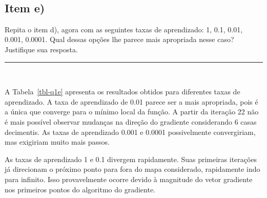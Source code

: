 \documentclass[
  a4paperpaper,
]{article}
\begin{document}
~

\subsection{Item e)}\label{item-e}

Repita o item d), agora com as seguintes taxas de aprendizado: 1, 0.1,
0.01, 0.001, 0.0001. Qual dessas opções lhe parece mais apropriada nesse
caso? Justifique sua resposta.

\begin{center}\rule{0.5\linewidth}{0.5pt}\end{center}

~

A Tabela~\ref{tbl-q1e} apresenta os resultados obtidos para diferentes
taxas de aprendizado. A taxa de aprendizado de 0.01 parece ser a mais
apropriada, pois é a única que converge para o mínimo local da função. A
partir da iteração 22 não é mais possível observar mudanças na direção
do gradiente considerando 6 casas decimentis. As taxas de aprendizado
0.001 e 0.0001 possivelmente convergiriam, mas exigiriam muito mais
passos.

As taxas de aprendizado 1 e 0.1 divergem rapidamente. Suas primeiras
iterações já direcionam o próximo ponto para fora do mapa considerado,
rapidamente indo para infinito. Isso provavelmente ocorre devido à
magnitude do vetor gradiente nos primeiros pontos do algoritmo do
gradiente.

~
\end{document}
